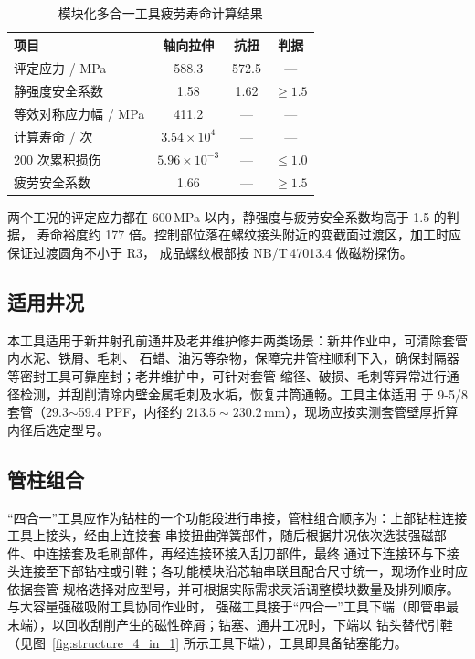 \begin{table}[htbp]
\centering
\caption{模块化多合一工具疲劳寿命计算结果}
\label{tab:fatigue_4in1}
\begin{tabular}{lccc}
\hline
项目 & 轴向拉伸 & 抗扭 & 判据 \\
\hline
评定应力 / MPa & 588.3 & 572.5 & --- \\
静强度安全系数 & 1.58 & 1.62 & $\ge 1.5$ \\
等效对称应力幅 / MPa & 411.2 & --- & --- \\
计算寿命 / 次 & $3.54\times10^{4}$ & --- & --- \\
200 次累积损伤 & $5.96\times10^{-3}$ & --- & $\le 1.0$ \\
疲劳安全系数 & 1.66 & --- & $\ge 1.5$ \\
\hline
\end{tabular}
\end{table}

两个工况的评定应力都在 600\,MPa 以内，静强度与疲劳安全系数均高于 1.5 的判据，
寿命裕度约 177 倍。控制部位落在螺纹接头附近的变截面过渡区，加工时应保证过渡圆角不小于 R3，
成品螺纹根部按 NB/T\,47013.4 做磁粉探伤。

\subsection{适用井况}

本工具适用于新井射孔前通井及老井维护修井两类场景：新井作业中，可清除套管内水泥、铁屑、毛刺、
石蜡、油污等杂物，保障完井管柱顺利下入，确保封隔器等密封工具可靠座封；老井维护中，可针对套管
缩径、破损、毛刺等异常进行通径检测，并刮削清除内壁金属毛刺及水垢，恢复井筒通畅。工具主体适用
于 9-5/8\inch 套管（29.3$\sim$59.4 PPF，内径约 $213.5\sim230.2$\,mm），现场应按实测套管壁厚折算
内径后选定型号。

\subsection{管柱组合}

“四合一”工具应作为钻柱的一个功能段进行串接，管柱组合顺序为：上部钻柱连接工具上接头，经由上连接套
串接扭曲弹簧部件，随后根据井况依次选装强磁部件、中连接套及毛刷部件，再经连接环接入刮刀部件，最终
通过下连接环与下接头连接至下部钻柱或引鞋；各功能模块沿芯轴串联且配合尺寸统一，现场作业时应依据套管
规格选择对应型号，并可根据实际需求灵活调整模块数量及排列顺序。与大容量强磁吸附工具协同作业时，
强磁工具接于“四合一”工具下端（即管串最末端），以回收刮削产生的磁性碎屑；钻塞、通井工况时，下端以
钻头替代引鞋（见图~\ref{fig:structure_4_in_1} 所示工具下端），工具即具备钻塞能力。

